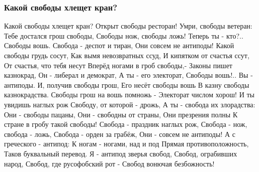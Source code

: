  
 
 

\subsubsection{Какой свободы хлещет кран?}
\label{sec:poetry.rus.moritz_yunna.svoboda_kran}

\obeycr
Какой свободы хлещет кран?
Открыт свободы ресторан!
Умри, свободы ветеран:
Тебе достался грош свободы,
Свободы нож, свободы ложь!
Теперь ты - кто?.. Свободы вошь.
Свобода - деспот и тиран,
Они совсем не антиподы!
Какой свободы грудь сосут,
Как вымя невозвратных ссуд,
И кипятком от счастья ссут,
От счастья, что тебя несут
Вперёд ногами в гроб свободы,-
Законы пишет казнокрад,
Он - либерал и демократ,
А ты - его электорат,
Свободы вошь!.. Вы - антиподы.
И, получив свободы грош,
Его несёт свободы вошь
В казну свободы казнокрадства.
Свободы грош на вошь помножь -
Электорат числом хорош!
И ты увидишь наглых рож
Свободу, от которой - дрожь,
А ты - свобода их злорадства:
Они - свободы пацаны,
Они - свободны от страны,
Они презрения полны
К стране в гробу такой свободы!
Свобода - праздник наглых рож,
Свобода - нож, свобода - ложь,
Свобода - орден за грабёж,
Они - совсем не антиподы!
А с греческого - антипод:
К ногам - ногами, над и под
Прямая противоположность,
Таков буквальный перевод.
Я - антипод зверья свобод,
Свобод, ограбивших народ,
Свобод, где русофобский рот -
Свобод вонючая безбожность!
\restorecr
